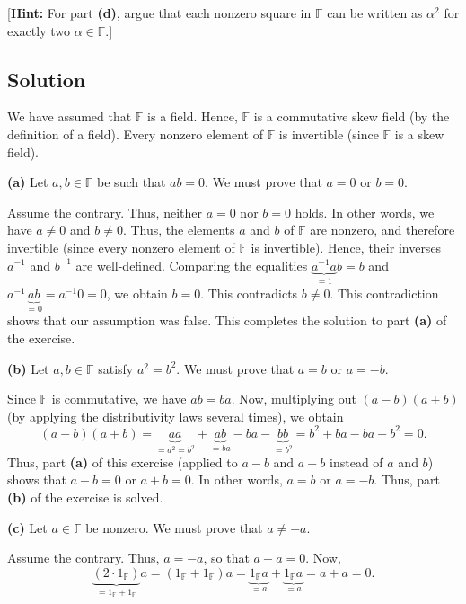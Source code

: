 \documentclass[paper=a4, fontsize=12pt]{scrartcl}%
\theoremstyle{plainsl}
\theoremstyle{definition}
\theoremstyle{remark}
\begin{document}
[\textbf{Hint:} For part \textbf{(d)}, argue that each nonzero square in
$\mathbb{F}$ can be written as $\alpha^{2}$ for exactly two $\alpha
\in\mathbb{F}$.]

\subsection{Solution}

We have assumed that $\mathbb{F}$ is a field. Hence, $\mathbb{F}$ is a
commutative skew field (by the definition of a field). Every nonzero element
of $\mathbb{F}$ is invertible (since $\mathbb{F}$ is a skew field).

\bigskip

\textbf{(a)} Let $a,b\in\mathbb{F}$ be such that $ab=0$. We must prove that
$a=0$ or $b=0$.

Assume the contrary. Thus, neither $a=0$ nor $b=0$ holds. In other words, we
have $a\neq0$ and $b\neq0$. Thus, the elements $a$ and $b$ of $\mathbb{F}$ are
nonzero, and therefore invertible (since every nonzero element of $\mathbb{F}$
is invertible). Hence, their inverses $a^{-1}$ and $b^{-1}$ are well-defined.
Comparing the equalities $\underbrace{a^{-1}a}_{=1}b=b$ and $a^{-1}%
\underbrace{ab}_{=0}=a^{-1}0=0$, we obtain $b=0$. This contradicts $b\neq0$.
This contradiction shows that our assumption was false. This completes the
solution to part \textbf{(a)} of the exercise.

\bigskip

\textbf{(b)} Let $a,b\in\mathbb{F}$ satisfy $a^{2}=b^{2}$. We must prove that
$a=b$ or $a=-b$.

Since $\mathbb{F}$ is commutative, we have $ab=ba$. Now, multiplying out
$\left(  a-b\right)  \left(  a+b\right)  $ (by applying the distributivity
laws several times), we obtain%
\[
\left(  a-b\right)  \left(  a+b\right)  =\underbrace{aa}_{=a^{2}=b^{2}%
}+\underbrace{ab}_{=ba}-ba-\underbrace{bb}_{=b^{2}}=b^{2}+ba-ba-b^{2}=0.
\]
Thus, part \textbf{(a)} of this exercise (applied to $a-b$ and $a+b$ instead
of $a$ and $b$) shows that $a-b=0$ or $a+b=0$. In other words, $a=b$ or
$a=-b$. Thus, part \textbf{(b)} of the exercise is solved.

\bigskip

\textbf{(c)} Let $a\in\mathbb{F}$ be nonzero. We must prove that $a\neq-a$.

Assume the contrary. Thus, $a=-a$, so that $a+a=0$. Now,%
\[
\underbrace{\left(  2\cdot1_{\mathbb{F}}\right)  }_{=1_{\mathbb{F}%
}+1_{\mathbb{F}}}a=\left(  1_{\mathbb{F}}+1_{\mathbb{F}}\right)
a=\underbrace{1_{\mathbb{F}}a}_{=a}+\underbrace{1_{\mathbb{F}}a}_{=a}=a+a=0.
\]
\end{document}
